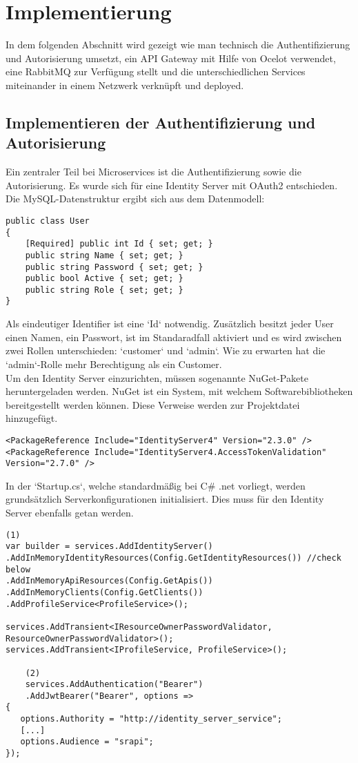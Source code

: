\section{Implementierung}
In dem folgenden Abschnitt wird gezeigt wie man technisch die Authentifizierung und Autorisierung umsetzt, ein API Gateway mit Hilfe von Ocelot verwendet, eine RabbitMQ zur Verfügung stellt und die unterschiedlichen Services miteinander in einem Netzwerk verknüpft und deployed.  

\subsection{Implementieren der Authentifizierung und Autorisierung}
Ein zentraler Teil bei Microservices ist die Authentifizierung sowie die Autorisierung. Es wurde sich für eine Identity Server mit OAuth2 entschieden. Die MySQL-Datenstruktur ergibt sich aus dem Datenmodell:

\begin{verbatim}
public class User
{
    [Required] public int Id { set; get; }
    public string Name { set; get; }
    public string Password { set; get; }
    public bool Active { set; get; }
    public string Role { set; get; }
}
\end{verbatim}

Als eindeutiger Identifier ist eine `Id` notwendig. Zusätzlich besitzt jeder User einen Namen, ein Passwort, ist im Standaradfall aktiviert und es wird zwischen zwei Rollen unterschieden: `customer` und  `admin`. Wie zu erwarten hat die `admin`-Rolle mehr Berechtigung als ein Customer. \\

Um den Identity Server einzurichten, müssen sogenannte NuGet-Pakete heruntergeladen werden. NuGet ist ein System, mit welchem Softwarebibliotheken bereitgestellt werden können. Diese Verweise werden zur Projektdatei hinzugefügt.

\begin{verbatim}
<PackageReference Include="IdentityServer4" Version="2.3.0" />
<PackageReference Include="IdentityServer4.AccessTokenValidation" Version="2.7.0" />
\end{verbatim}

In der `Startup.cs`, welche standardmäßig bei C\# .net vorliegt, werden grundsätzlich Serverkonfigurationen initialisiert. Dies muss für den Identity Server ebenfalls getan werden.

\begin{verbatim}
(1)
var builder = services.AddIdentityServer()
.AddInMemoryIdentityResources(Config.GetIdentityResources()) //check below
.AddInMemoryApiResources(Config.GetApis())
.AddInMemoryClients(Config.GetClients())
.AddProfileService<ProfileService>();

services.AddTransient<IResourceOwnerPasswordValidator, ResourceOwnerPasswordValidator>();
services.AddTransient<IProfileService, ProfileService>();
	
	(2)
	services.AddAuthentication("Bearer")
	.AddJwtBearer("Bearer", options =>
{
   options.Authority = "http://identity_server_service";
   [...]
   options.Audience = "srapi";
});
\end{verbatim}  

